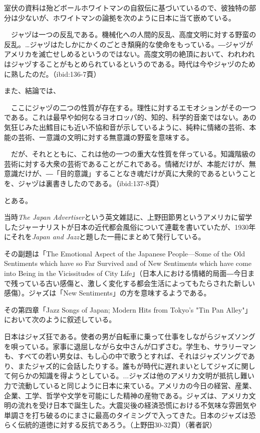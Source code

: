 室伏の資料は殆どボールホワイトマンの自叙伝に基づいているので、彼独特の部分は少ないが、ホワイトマンの論拠を次のように日本に当て嵌めている。

\begin{gquote}
　ジャヅは一つの反乱である。機械化への人間的反乱、高度文明に対する野蛮の反乱。…ジャヅはたしかにかくのごとき頽廃的な使命をもっている。―ジャヅがアメリカを滅亡せしめるというのではない。高度文明の絶頂において、われわれはジャヅすることがもとめられているというのである。時代は今やジャヅのために熟したのだ。（ibid:136-7頁）
\end{gquote}

また、結論では、

\begin{gquote}
　ここにジャヅの二つの性質が存在する。理性に対するエモオションがその一つである。これは最早や如何なるヨオロッパ的、知的、科学的音楽ではない。あの気狂じみた出鱈目にも近い不協和音が示しているように、純粋に情緒の芸術、本能の芸術、一意識の文明に対する無意識の野蛮を意味する。\par{}　だが、それとともに、これは他の一つの重大な性質を伴っている。知識階級の芸術に対する大衆の芸術であることがこれである。情緒だけが、本能だけが、無意識だけが、―「目的意識」することなき魂だけが真に大衆的であるということを、ジャヅは裏書きしたのである。（ibid:137-8頁）
\end{gquote}

とある。

当時\textit{The Japan Advertiser}という英文雑誌に、上野田節男というアメリカに留学したジャーナリストが日本の近代都会風俗について連載を書いていたが、1930年にそれを\textit{Japan and Jazz}と題した一冊にまとめて発行している。

その副題は「The Emotional Aspect of the Japanese People—Some of the Old Sentiments which have so Far Survived and of New Sentiments which have come into Being in the Vicissitudes of City Life」（日本人における情緒的局面―今日まで残っている古い感傷と、激しく変化する都会生活によってもたらされた新しい感傷）。ジャズは「New Sentiments」の方を意味するようである。

その第四章「Jazz Songs of Japan; Modern Hits from Tokyo's "Tin Pan Alley"」において次のように叙述している。

\begin{gquote}
日本はジャズ狂である。使者の男が自転車に乗って仕事をしながらジャズソングを唄っている。家事に退屈しながら女中さんが口ずさむ。学生も、サラリーマンも、すべての若い男女は、もし心の中で歌うとすれば、それはジャズソングであり、またジャズ的に会話したりする。誰もが時代に遅れまいとしてジャズに関して何らかの知識を得ようとしている。...ジャズは他のアメリカ文明が抵抗し難い力で流動していると同じように日本に来ている。アメリカの今日の経営、産業、企業、工学、哲学や文学を可能にした精神の産物である。ジャズは、アメリカ文明の流れを受け日本で誕生した。大震災後の経済恐慌における不気味な雰囲気や単調さを打ち破るのにまさに最高のタイミングで入ってきた。日本のジャズは恐らく伝統的道徳に対する反抗であろう。（上野田30-32頁）（著者訳）
\end{gquote}

